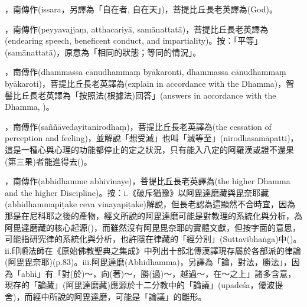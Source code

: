 \startitemgroup[noteitems]
\item{}，南傳作(issara，另譯為「自在者, 自在天」)，菩提比丘長老英譯為(God)。
\stopitemgroup

\startitemgroup[noteitems]
\item{}，南傳作(peyyavajjaṃ, atthacariyā, samānattatā)，菩提比丘長老英譯為(endearing speech, beneficent conduct, and impartiality)。按：「平等」(samānattatā)，原意為「相同的狀態；等同的情況」。
\stopitemgroup

\startitemgroup[noteitems]
\item{}，南傳作(dhammassa cānudhammaṃ byākaronti, dhammassa cānudhammaṃ byākaroti)，菩提比丘長老英譯為(explain in accordance with the Dhamma)，智髻比丘長老英譯為「按照法(根據法)回答」(answers in accordance with the Dhamma, )。
\stopitemgroup

\startitemgroup[noteitems]
\item{}，南傳作(saññāvedayitanirodhaṃ)，菩提比丘長老英譯為(the cessation of perception and feeling)，並解說「想受滅」也叫「滅等至」(nirodhasamāpatti)，這是一種心與心理的功能都停止的定之狀況，只有能入八定的阿羅漢或證不還果(第三果)者能進得去()。
\stopitemgroup

\startitemgroup[noteitems]
\item{}，南傳作(abhidhamme abhivinaye)，菩提比丘長老英譯為(the higher Dhamma and the higher Discipline)。按：i.《破斥猶豫》以阿毘達磨藏與毘奈耶藏(abhidhammapiṭake ceva vinayapiṭake)解說，但長老認為這顯然不合時宜，因為那是在尼科耶之後的產物，經文所說的阿毘達磨可能是對教理的系統化與分析，為阿毘達磨藏的核心起源()，而雖然沒有阿毘毘奈耶的實體文獻，但按字面的意思，可能指研究律的系統化與分析，也許隱在律藏的「經分別」(Suttavibhaṅga)中()。ii.印順法師在《原始佛教聖典之集成》中列出十部北傳漢譯現存屬於各部派的律論(阿毘毘奈耶)(p.83)。iii.阿毘達磨(Abhidhamma)，另譯為「論，對法，勝法」，因為「abhi」有「對(於)～，向(著)～，勝(過)～，越過～，在～之上」諸多含意，現存的「論藏」(阿毘達磨藏)應源於十二分教中的「論議」(upadeśa，優波提舍)，而經中所說的阿毘達磨，可能是「論議」的雛形。
\stopitemgroup

